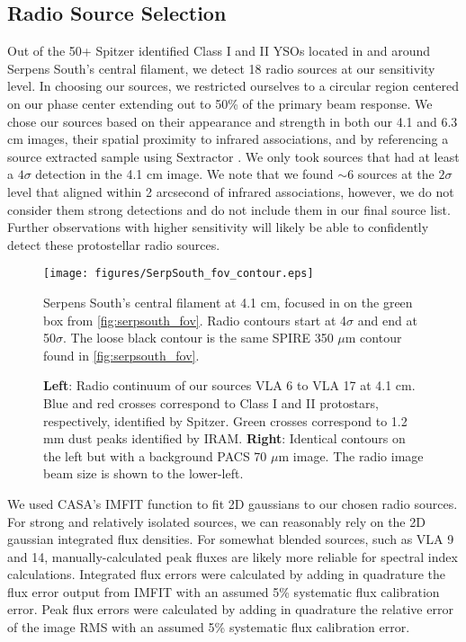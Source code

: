 \documentclass[apj]{emulateapj}
\begin{document}
\capstarttrue

\subsection{Radio Source Selection}
\label{sec:radio source selection}

Out of the 50+ Spitzer identified Class I and II YSOs located in and around Serpens South's central filament, we detect 18 radio sources at our sensitivity level. In choosing our sources, we restricted ourselves to a circular region centered on our phase center extending out to 50\% of the primary beam response. We chose our sources based on their appearance and strength in both our 4.1 and 6.3 cm images, their spatial proximity to infrared associations, and by referencing a source extracted sample using Sextractor \citep{Bertin96}. We only took sources that had at least a $4\sigma$ detection in the 4.1 cm image. We note that we found $\sim$6 sources at the $2\sigma$ level that aligned within 2 arcsecond of infrared associations, however, we do not consider them strong detections and do not include them in our final source list. Further observations with higher sensitivity will likely be able to confidently detect these protostellar radio sources.

\begin{figure}
\label{fig:serpsouth_fov_contour}
\centering
\texttt{[image: figures/SerpSouth\_fov\_contour.eps]}
\caption{\small{Serpens South's central filament at 4.1 cm, focused in on the green box from \autoref{fig:serpsouth_fov}. Radio contours start at 4$\sigma$ and end at 50$\sigma$. The loose black contour is the same SPIRE 350 $\mu$m contour found in \autoref{fig:serpsouth_fov}. 
}}
\end{figure}

\begin{figure*}
\label{fig:zoom}
\caption{{\bfseries Left}: Radio continuum of our sources VLA 6 to VLA 17 at 4.1 cm. Blue and red crosses correspond to Class I and II protostars, respectively, identified by Spitzer. Green crosses correspond to 1.2 mm dust peaks identified by IRAM. {\bfseries Right}: Identical contours on the left but with a background PACS 70 $\mu$m image. The radio image beam size is shown to the lower-left.}
\end{figure*}

We used CASA's IMFIT function to fit 2D gaussians to our chosen radio sources. For strong and relatively isolated sources, we can reasonably rely on the 2D gaussian integrated flux densities. For somewhat blended sources, such as VLA 9 and 14, manually-calculated peak fluxes are likely more reliable for spectral index calculations. Integrated flux errors were calculated by adding in quadrature the flux error output from IMFIT with an assumed 5\% systematic flux calibration error. Peak flux errors were calculated by adding in quadrature the relative error of the image RMS with an assumed 5\% systematic flux calibration error.
\end{document}

